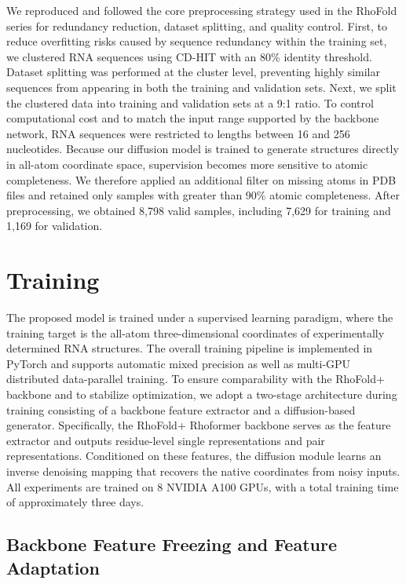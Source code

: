 We reproduced and followed the core preprocessing strategy used in the RhoFold series for redundancy reduction, dataset splitting, and quality control. First, to reduce overfitting risks caused by sequence redundancy within the training set, we clustered RNA sequences using CD-HIT with an 80\% identity threshold\cite{li2006cdhit, fu2012cdhit}. Dataset splitting was performed at the cluster level, preventing highly similar sequences from appearing in both the training and validation sets. Next, we split the clustered data into training and validation sets at a 9:1 ratio. To control computational cost and to match the input range supported by the backbone network, RNA sequences were restricted to lengths between 16 and 256 nucleotides. Because our diffusion model is trained to generate structures directly in all-atom coordinate space, supervision becomes more sensitive to atomic completeness. We therefore applied an additional filter on missing atoms in PDB files and retained only samples with greater than 90\% atomic completeness. After preprocessing, we obtained 8,798 valid samples, including 7,629 for training and 1,169 for validation.

\section{Training}

The proposed model is trained under a supervised learning paradigm, where the training target is the all-atom three-dimensional coordinates of experimentally determined RNA structures. The overall training pipeline is implemented in PyTorch and supports automatic mixed precision as well as multi-GPU distributed data-parallel training. To ensure comparability with the RhoFold+ backbone and to stabilize optimization, we adopt a two-stage architecture during training consisting of a backbone feature extractor and a diffusion-based generator. Specifically, the RhoFold+ Rhoformer backbone serves as the feature extractor and outputs residue-level single representations and pair representations. Conditioned on these features, the diffusion module learns an inverse denoising mapping that recovers the native coordinates from noisy inputs. All experiments are trained on 8 NVIDIA A100 GPUs, with a total training time of approximately three days.

\subsection{Backbone Feature Freezing and Feature Adaptation}

